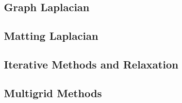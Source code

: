 \subsection{Graph Laplacian}

\subsection{Matting Laplacian}

\subsection{Iterative Methods and Relaxation}

\subsection{Multigrid Methods}
